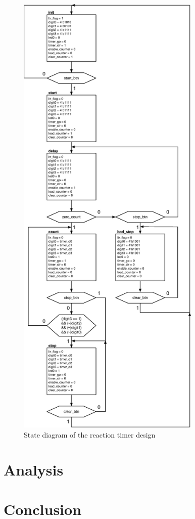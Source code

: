 \documentclass[11pt]{article}
\begin{document}
\pagebreak
\begin{figure}[H]
	\includegraphics [width=3.45in]{state_diagram.eps}
	\centering
	\caption{State diagram of the reaction timer design}
	\label{fig:state_diagram}
\end{figure}

\section{Analysis}

\section{Conclusion}
\end{document}
